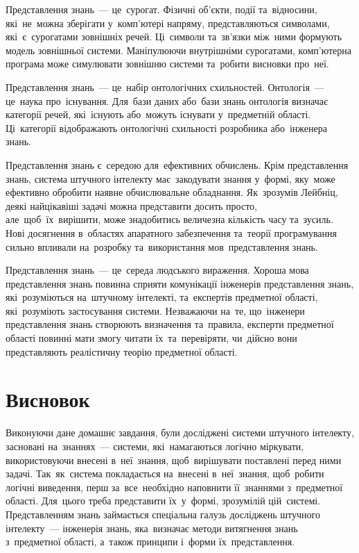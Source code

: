 \documentclass[
  a4paper,
  oneside,
  BCOR = 10mm,
  DIV = 12,
  12pt,
  headings = normal,
]{scrartcl}
\begin{document}
      \begin{hangenumerate}
        \item Представлення знань~— це~сурогат. Фізичні об'єкти, події та~відносини, які~не~можна зберігати у~комп'ютері напряму, представляються символами, які~є~сурогатами зовнішніх речей. Ці~символи та~зв'язки між~ними формують модель зовнішньої системи. Маніпулюючи внутрішніми сурогатами, комп'ютерна програма може симулювати зовнішню системи та~робити висновки про~неї.
        \item Представлення знань~— це~набір онтологічних схильностей. Онтологія~— це~наука про~існування. Для~бази даних або~бази знань онтологія визначає категорії речей, які~існують або~можуть існувати у~предметній області. Ці~категорії відображають онтологічні схильності розробника або~інженера знань.
        \item Представлення знань є~середою для~ефективних обчислень. Крім представлення знань, система штучного інтелекту має~закодувати знання у~формі, яку~може ефективно обробити наявне обчислювальне обладнання. Як~зрозумів Лейбніц, деякі найцікавіші задачі можна представити досить просто, але~щоб~їх~вирішити, може знадобитись величезна кількість часу та~зусиль. Нові досягнення в~областях апаратного забезпечення та~теорії програмування сильно впливали на~розробку та~використання мов~представлення знань.
        \item Представлення знань~— це~середа людського вираження. Хороша мова представлення знань повинна сприяти комунікації інженерів представлення знань, які~розуміються на~штучному інтелекті, та~експертів предметної області, які~розуміють застосування системи. Незважаючи на~те, що~інженери представлення знань створюють визначення та~правила, експерти предметної області повинні мати змогу читати їх~та~перевіряти, чи~дійсно вони представляють реалістичну теорію предметної області.
      \end{hangenumerate}

  \clearpage
  \section{Висновок}
    Виконуючи дане домашнє завдання, були досліджені системи штучного інтелекту, засновані на~знаннях~— системи, які~намагаються логічно міркувати, використовуючи внесені в~неї~знання, щоб~вирішувати поставлені перед ними задачі. Так~як~система покладається на~внесені в~неї~знання, щоб~робити логічні виведення, перш за~все~необхідно наповнити її~знаннями з~предметної області. Для~цього треба представити їх~у~формі, зрозумілій цій~системі. Представленням знань займається спеціальна галузь досліджень штучного інтелекту~— інженерія знань, яка~визначає методи витягнення знань з~предметної області, а~також принципи і~форми їх~представлення.
\end{document}
